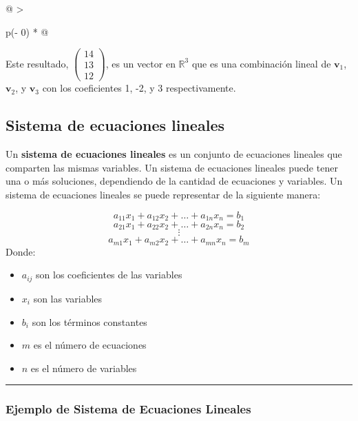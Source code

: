 \documentclass[
  letterpaper,
  DIV=11,
  numbers=noendperiod]{scrartcl}
\providecommand{\tightlist}{%
  \setlength{\itemsep}{0pt}\setlength{\parskip}{0pt}}\usepackage{longtable,booktabs,array}
\begin{document}
\begin{longtable}[]{@{}
  >{\raggedright\arraybackslash}p{(\columnwidth - 0\tabcolsep) * }@{}}
\toprule\noalign{}
\endhead
\bottomrule\noalign{}
\endlastfoot
Este resultado, \(\begin{pmatrix}
14 \\
13 \\
12
\end{pmatrix}\), es un vector en \(\mathbb{R}^3\) que es una combinación
lineal de \(\mathbf{v}_1\), \(\mathbf{v}_2\), y \(\mathbf{v}_3\) con los
coeficientes 1, -2, y 3 respectivamente. \\
\end{longtable}

\subsection{Sistema de ecuaciones
lineales}\label{sistema-de-ecuaciones-lineales}

Un \textbf{sistema de ecuaciones lineales} es un conjunto de ecuaciones
lineales que comparten las mismas variables. Un sistema de ecuaciones
lineales puede tener una o más soluciones, dependiendo de la cantidad de
ecuaciones y variables. Un sistema de ecuaciones lineales se puede
representar de la siguiente manera:

\[ a_{11} x_1 + a_{12} x_2 + \ldots + a_{1n} x_n = b_1 \]
\[ a_{21} x_1 + a_{22} x_2 + \ldots + a_{2n} x_n = b_2 \] \[ \vdots \]
\[ a_{m1} x_1 + a_{m2} x_2 + \ldots + a_{mn} x_n = b_m \] Donde:

\begin{itemize}
\tightlist
\item
  \(a_{ij}\) son los coeficientes de las variables
\item
  \(x_i\) son las variables
\item
  \(b_i\) son los términos constantes
\item
  \(m\) es el número de ecuaciones
\item
  \(n\) es el número de variables
\end{itemize}

\begin{center}\rule{0.5\linewidth}{0.5pt}\end{center}

\subsubsection{Ejemplo de Sistema de Ecuaciones
Lineales}\label{ejemplo-de-sistema-de-ecuaciones-lineales}
\end{document}
